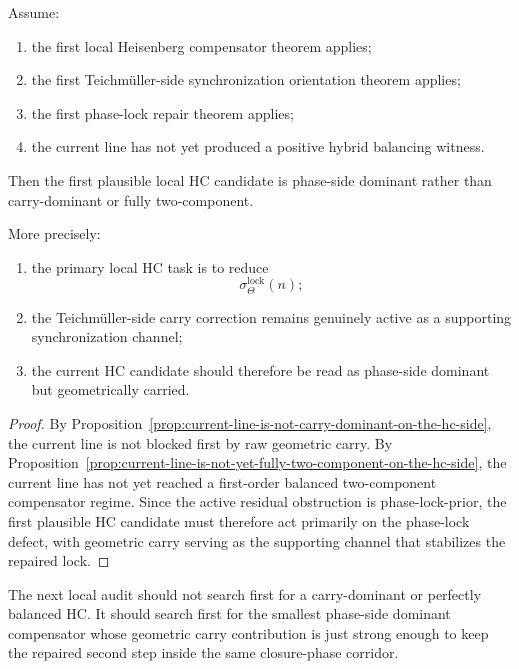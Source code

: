 \begin{theorem}
\label{thm:first-hc-candidate-type-orientation-theorem}
Assume:
\begin{enumerate}[leftmargin=2em,label=(\alph*)]
  \item the first local Heisenberg compensator theorem applies;
  \item the first Teichm\"uller-side synchronization orientation theorem applies;
  \item the first phase-lock repair theorem applies;
  \item the current line has not yet produced a positive hybrid balancing witness.
\end{enumerate}
Then the first plausible local HC candidate is phase-side dominant rather than carry-dominant or fully two-component.

More precisely:
\begin{enumerate}[leftmargin=2em,label=(\roman*)]
  \item the primary local HC task is to reduce
  \[
    \sigma_{\Theta}^{\mathrm{lock}}(n);
  \]
  \item the Teichm\"uller-side carry correction remains genuinely active as a supporting synchronization channel;
  \item the current HC candidate should therefore be read as phase-side dominant but geometrically carried.
\end{enumerate}
\end{theorem}

\begin{proof}
By Proposition~\ref{prop:current-line-is-not-carry-dominant-on-the-hc-side}, the current line is not blocked first by raw geometric carry. By Proposition~\ref{prop:current-line-is-not-yet-fully-two-component-on-the-hc-side}, the current line has not yet reached a first-order balanced two-component compensator regime. Since the active residual obstruction is phase-lock-prior, the first plausible HC candidate must therefore act primarily on the phase-lock defect, with geometric carry serving as the supporting channel that stabilizes the repaired lock.
\end{proof}

\begin{corollary}
\label{cor:current-hc-candidate-working-rule}
The next local audit should not search first for a carry-dominant or perfectly balanced HC. It should search first for the smallest phase-side dominant compensator whose geometric carry contribution is just strong enough to keep the repaired second step inside the same closure-phase corridor.
\end{corollary}

